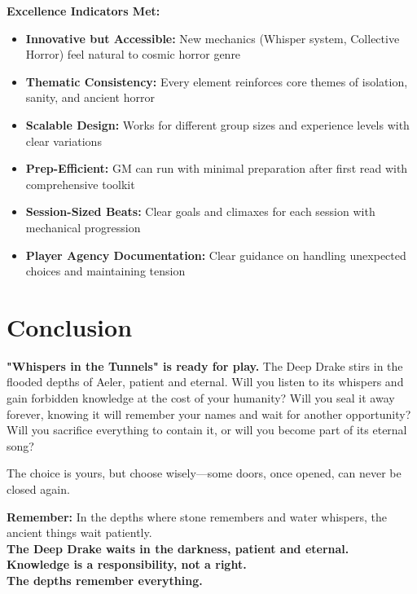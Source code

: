 \documentclass[11pt]{article}
\begin{document}
\textbf{Excellence Indicators Met:}
\begin{itemize}
\item \checkmark \textbf{Innovative but Accessible:} New mechanics (Whisper system, Collective Horror) feel natural to cosmic horror genre
\item \checkmark \textbf{Thematic Consistency:} Every element reinforces core themes of isolation, sanity, and ancient horror
\item \checkmark \textbf{Scalable Design:} Works for different group sizes and experience levels with clear variations
\item \checkmark \textbf{Prep-Efficient:} GM can run with minimal preparation after first read with comprehensive toolkit
\item \checkmark \textbf{Session-Sized Beats:} Clear goals and climaxes for each session with mechanical progression
\item \checkmark \textbf{Player Agency Documentation:} Clear guidance on handling unexpected choices and maintaining tension
\end{itemize}

\section*{Conclusion}

\textbf{"Whispers in the Tunnels" is ready for play.} The Deep Drake stirs in the flooded depths of Aeler, patient and eternal. Will you listen to its whispers and gain forbidden knowledge at the cost of your humanity? Will you seal it away forever, knowing it will remember your names and wait for another opportunity? Will you sacrifice everything to contain it, or will you become part of its eternal song?

The choice is yours, but choose wisely—some doors, once opened, can never be closed again.

\begin{center}

\vspace{1cm}

\textbf{Remember:} In the depths where stone remembers and water whispers, the ancient things wait patiently.\\
\textbf{The Deep Drake waits in the darkness, patient and eternal.}\\
\textbf{Knowledge is a responsibility, not a right.}\\
\textbf{The depths remember everything.}
\end{center}
\end{document}
